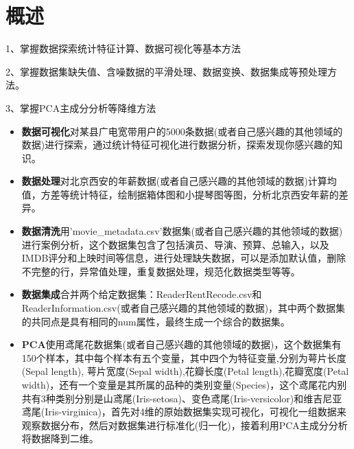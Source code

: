\documentclass[a4paper]{article}
\begin{document}


\section{概述} \label{overview}%

1、掌握数据探索统计特征计算、数据可视化等基本方法

2、掌握数据集缺失值、含噪数据的平滑处理、数据变换、数据集成等预处理方法。

3、掌握PCA主成分分析等降维方法

\begin{itemize}
	\item{\textbf{数据可视化}对某县广电宽带用户的5000条数据(或者自己感兴趣的其他领域的数据)进行探索，通过统计特征可视化进行数据分析，探索发现你感兴趣的知识。}
    \item{\textbf{数据处理}对北京西安的年薪数据(或者自己感兴趣的其他领域的数据)计算均值，方差等统计特征，绘制据箱体图和小提琴图等图，分析北京西安年薪的差异。}
    \item{\textbf{数据清洗}用'movie\_metadata.csv'数据集(或者自己感兴趣的其他领域的数据)进行案例分析，这个数据集包含了包括演员、导演、预算、总输入，以及IMDB评分和上映时间等信息，进行处理缺失数据，可以是添加默认值，删除不完整的行，异常值处理，重复数据处理，规范化数据类型等等。
    }
    \item{\textbf{数据集成}合并两个给定数据集：ReaderRentRecode.csv和ReaderInformation.csv(或者自己感兴趣的其他领域的数据)，其中两个数据集的共同点是具有相同的num属性，最终生成一个综合的数据集。
    }
    \item{\textbf{PCA}使用鸢尾花数据集(或者自己感兴趣的其他领域的数据)，这个数据集有150个样本，其中每个样本有五个变量，其中四个为特征变量,分别为萼片长度(Sepal length), 萼片宽度(Sepal width),花瓣长度(Petal length),花瓣宽度(Petal width)，还有一个变量是其所属的品种的类别变量(Species)，这个鸢尾花内别共有3种类别分别是山鸢尾(Iris-setosa)、变色鸢尾(Iris-versicolor)和维吉尼亚鸢尾(Iris-virginica)，首先对4维的原始数据集实现可视化，可视化一组数据来观察数据分布，然后对数据集进行标准化(归一化)，接着利用PCA主成分分析将数据降到二维。}
\end{itemize}

\end{document}
